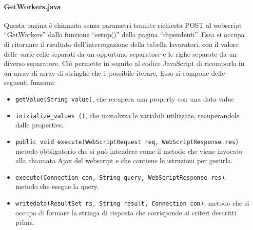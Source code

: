 \paragraph{GetWorkers.java}
Questa pagina è chiamata senza parametri tramite richiesta POST al webscript “GetWorkers” dalla funzione “setup()” della pagina “dipendenti”. Essa si occupa di ritornare il risultato dell’interrogazione della tabella lavoratori, con il valore delle varie celle separati da un opportuno separatore e le righe separate da un diverso separatore. Ciò permette in seguito al codice JavaScript di ricomporla in un array di array di stringhe  che è possibile iterare.
Esso si compone delle seguenti funzioni:
\begin{itemize}
\item \texttt{getValue(String value)}, che recupera una property con una data value
\item \texttt{inizialize\_values ()}, che inizializza le variabili utilizzate, recuperandole dalle properties.
\item \texttt{public void execute(WebScriptRequest req, WebScriptResponse res)} metodo obbligatorio che si può intendere come il metodo che viene invocato alla chiamata Ajax del webscript e che contiene le istruzioni per gestirla.
\item \texttt{execute(Connection con, String query, WebScriptResponse res)}, metodo che esegue la query.
\item \texttt{writedata(ResultSet rs, String result, Connection con)}, metodo che si occupa di formare la stringa di risposta che corrisponde ai criteri descritti prima.
\end{itemize}
